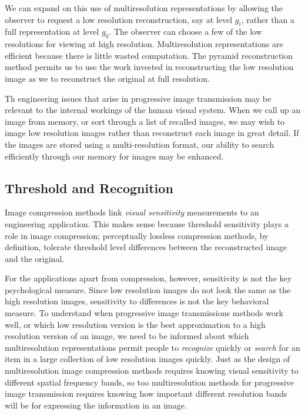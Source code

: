 We can expand on this use of multiresolution representations by
allowing the observer to request a low resolution reconstruction, say
at level $g_i$, rather than a full representation at level $g_0$.  The
observer can choose a few of the low resolutions for viewing at high
resolution.  Multiresolution representations are efficient because
there is little wasted computation.  The pyramid reconstruction method
permits us to use the work invested in reconstructing the low
resolution image as we to reconstruct the original at full resolution.

Th engineering issues that arise in progressive image transmission may
be relevant to the internal workings of the human visual system.  When
we call up an image from memory, or sort through a list of recalled
images, we may wish to image low resolution images rather than
reconstruct each image in great detail.  If the images are stored
using a multi-resolution format, our ability to search efficiently
through our memory for images may be enhanced.

\subsection*{Threshold and Recognition}
Image compression methods link {\em visual sensitivity} measurements
to an engineering application.  This makes sense because threshold
sensitivity plays a role in image compression; perceptually lossless
compression methods, by definition, tolerate threshold level
differences between the reconstructed image and the original.

For the applications apart from compression, however, sensitivity is
not the key psychological measure.  Since low resolution images do not
look the same as the high resolution images, sensitivity to
differences is not the key behavioral measure.  To understand when
progressive image transmissions methods work well, or which low
resolution version is the best approximation to a high resolution
version of an image, we need to be informed about which
multiresolution representations permit people to {\em recognize}
quickly or {\em search} for an item in a large collection of low
resolution images quickly.  Just as the design of multiresolution
image compression methods requires knowing visual sensitivity to
different spatial frequency bands, so too multiresolution methods for
progressive image transmission requires knowing how important
different resolution bands will be for expressing the information in
an image.

